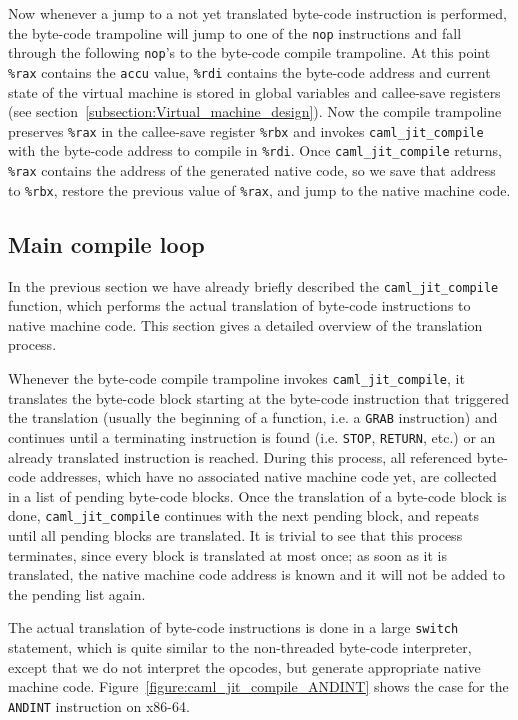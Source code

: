 \documentclass[a4paper]{acm_proc_article-sp}
\begin{document}
Now whenever a jump to a not yet translated byte-code instruction is performed, the byte-code trampoline
will jump to one of the \texttt{nop} instructions and fall through the following \texttt{nop}'s to the
byte-code compile trampoline. At this point \texttt{\%rax} contains the \texttt{accu} value, \texttt{\%rdi}
contains the byte-code address and current state of the virtual machine is stored in global variables
and callee-save registers (see section~\ref{subsection:Virtual_machine_design}).
Now the compile trampoline preserves \texttt{\%rax} in the
callee-save register \texttt{\%rbx} and invokes \texttt{caml\_jit\_compile} with the byte-code address to
compile in \texttt{\%rdi}. Once \texttt{caml\_jit\_compile} returns, \texttt{\%rax} contains the
address of the generated native code, so we save that address to \texttt{\%rbx}, restore the previous
value of \texttt{\%rax}, and jump to the native machine code.

\subsection{Main compile loop}

In the previous section we have already briefly described the \texttt{caml\_jit\_compile} function,
which performs the actual translation of byte-code instructions to native machine code. This section
gives a detailed overview of the translation process.

Whenever the byte-code compile trampoline invokes \linebreak[4]\texttt{caml\_jit\_compile}, it translates the byte-code
block starting at the byte-code instruction that triggered the translation (usually the beginning of a function,
i.e. a \texttt{GRAB} instruction)
and continues until a terminating instruction is found (i.e. \texttt{STOP}, \texttt{RETURN}, etc.) or an already
translated instruction is reached. During this process, all referenced byte-code addresses, which have no associated 
native machine code yet, are collected in a list of pending byte-code blocks. Once the translation of a byte-code
block is done, \texttt{caml\_jit\_compile} continues with the next pending block, and repeats until
all pending blocks are translated. It is trivial to see that this process terminates, since 
every block is translated at most once; as soon as it is translated, the native machine code address
is known and it will not be added to the pending list again.

The actual translation of byte-code instructions is done in a large \texttt{switch} statement, which is
quite similar to the non-threaded byte-code interpreter, except that we do not interpret the opcodes,
but generate appropriate native machine code. Figure~\ref{figure:caml_jit_compile_ANDINT} shows the 
case for the \texttt{ANDINT} instruction on x86-64.
\end{document}
